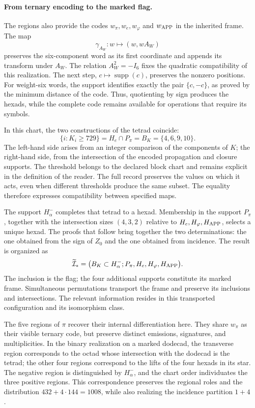 \paragraph{From ternary encoding to the marked flag.}
\label{inc-ampl-bandera}
The regions also provide the codes $w_\pi,w_e,w_\varphi$ and
$w_{\rm APP}$ in the inherited frame. The map
\[
 \gamma_{A_W}:w\longmapsto(w,wA_W)
\]
preserves the six-component word as its first coordinate and appends its
transform under $A_W$. The relation $A_W^2=-I_6$ fixes the quadratic
compatibility of this realization. The next step,
$c\mapsto\operatorname{supp}(c)$, preserves the nonzero positions. For
weight-six words, the support identifies exactly the pair $\{c,-c\}$, as
proved by the minimum distance of the code. Thus, quotienting by sign produces
the hexads, while the complete code remains available for operations that
require its symbols.

In this chart, the two constructions of the tetrad coincide:
\begin{equation}
 \{i:K_i\geq729\}
 =H_e\cap P_\pi=B_K=\{4,6,9,10\}.
 \label{inc-ampl-cuaterna}
\end{equation}
The left-hand side arises from an integer comparison of the components of
$K$; the right-hand side, from the intersection of the encoded propagation
and closure supports. The threshold belongs to the declared block chart and
remains explicit in the definition of the reader. The full record preserves
the values on which it acts, even when different thresholds produce the same
subset. The equality therefore expresses compatibility between specified
maps.

The support $H^-_\alpha$ completes that tetrad to a hexad. Membership in the
support $P_\pi$, together with the intersection sizes $(4,3,2)$ relative to
$H_e,H_\varphi,H_{\rm APP}$, selects a unique hexad. The proofs that follow
bring together the two determinations: the one obtained from the sign of
$Z_0$ and the one obtained from incidence. The result is organized as
\begin{equation}
 \widetilde{\mathcal I}_*
 =\bigl(B_K\subset H^-_\alpha;
         P_\pi,H_e,H_\varphi,H_{\rm APP}\bigr).
 \label{inc-ampl-marco}
\end{equation}
The inclusion is the flag; the four additional supports constitute its marked
frame. Simultaneous permutations transport the frame and preserve its
inclusions and intersections. The relevant information resides in this
transported configuration and its isomorphism class.

The five regions of $\pi$ recover their internal differentiation here. They
share $w_\pi$ as their visible ternary code, but preserve distinct emissions,
signatures, and multiplicities. In the binary realization on a marked
dodecad, the transverse region corresponds to the octad whose intersection
with the dodecad is the tetrad; the other four regions correspond to the
lifts of the four hexads in its star. The negative region is distinguished by
$H^-_\alpha$, and the chart order individuates the three positive regions.
This correspondence preserves the regional roles and the distribution
$432+4\cdot144=1008$, while also realizing the incidence partition $1+4$.
